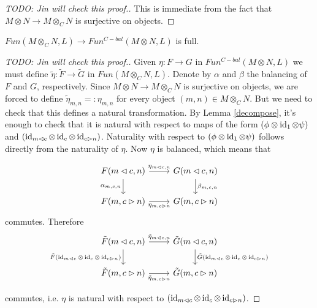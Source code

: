 \begin{proof}
  [TODO: Jin will check this proof.] This is immediate from the fact that
  $M\otimes N \to M\otimes_C N$ is surjective on objects.
\end{proof}

\begin{lemma}\label{full}
  $Fun(M\otimes_C N,L)\to Fun^{C-bal}(M\otimes N,L)$ is full.
\end{lemma}

\begin{proof}
  [TODO: Jin will check this proof.]

  Given $\eta:F\to G$ in $Fun^{C-bal}(M\otimes N,L)$ we must define
  $\tilde{\eta}:\tilde{F}\to\tilde{G}$ in $Fun(M\otimes_C N,L)$. Denote by
  $\alpha$ and $\beta$ the balancing of $F$ and $G$, respectively. Since
  $M\otimes N\to M\otimes_C N$ is surjective on objects, we are forced to
  define $\tilde{\eta}_{m,n}=:\eta_{m,n}$ for every object $(m,n)\in
  M\otimes_C N$. But we need to check that this defines a natural
  transformation. By Lemma \ref{decompose}, it's enough to check that it is
  natural with respect to maps of the form $(\phi\otimes\operatorname{id}_1\otimes\psi)$ and
  $(\operatorname{id}_{m\lhd c}\otimes\operatorname{id}_c\otimes\operatorname{id}_{c\rhd n})$. Naturality with respect
  to $(\phi\otimes\operatorname{id}_1\otimes\psi)$ follows directly from the naturality of
  $\eta$. Now $\eta$ is balanced, which means that

  \[
    \begin{tikzcd}
      {F(m\lhd c, n)} & {G(m\lhd c, n)} \\
      {F(m,c\rhd n)} & {G(m,c\rhd n)}
      \arrow["{\eta_{m\lhd c, n}}", from=1-1, to=1-2]
      \arrow["{\alpha_{m,c,n}}"', from=1-1, to=2-1]
      \arrow["{\beta_{m,c,n}}", from=1-2, to=2-2]
      \arrow["{\eta_{m,c\rhd n}}"', from=2-1, to=2-2]
    \end{tikzcd}\]
  commutes. Therefore
  \[
    \begin{tikzcd}
      {\tilde{F}(m\lhd c, n)} & {\tilde{G}(m\lhd c, n)} \\
      {\tilde{F}(m,c\rhd n)} & {\tilde{G}(m,c\rhd n)}
      \arrow["{\tilde{\eta}_{m\lhd c, n}}", from=1-1, to=1-2]
      \arrow["{\tilde{F}(\id_{m\lhd c}\otimes\id_c\otimes\id_{c\rhd n})}"', from=1-1, to=2-1]
      \arrow["{\tilde{G}(\id_{m\lhd c}\otimes\id_c\otimes\id_{c\rhd n})}", from=1-2, to=2-2]
      \arrow["{\tilde{\eta}_{m,c\rhd n}}"', from=2-1, to=2-2]
    \end{tikzcd}
  \]

  commutes, i.e. $\eta$ is natural with respect to $(\operatorname{id}_{m\lhd
  c}\otimes\operatorname{id}_c\otimes\operatorname{id}_{c\rhd n})$.
\end{proof}

